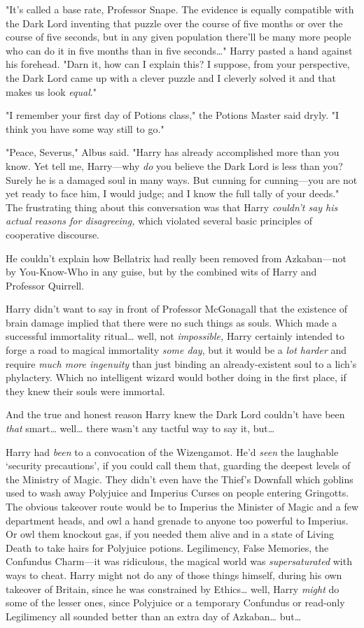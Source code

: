 "It's called a base rate, Professor Snape. The evidence is equally compatible
with the Dark Lord inventing that puzzle over the course of five months or over
the course of five seconds, but in any given population there'll be many more
people who can do it in five months than in five seconds{\ldots}" Harry pasted
a hand against his forehead. "Darn it, how can I explain this? I suppose, from
your perspective, the Dark Lord came up with a clever puzzle and I cleverly
solved it and that makes us look \emph{equal}."

"I remember your first day of Potions class," the Potions Master said dryly. "I
think you have some way still to go."

"Peace, Severus," Albus said. "Harry has already accomplished more than you
know. Yet tell me, Harry---why \emph{do} you believe the Dark Lord is less than
you? Surely he is a damaged soul in many ways. But cunning for cunning---you
are not yet ready to face him, I would judge; and I know the full tally of your
deeds."
\later
The frustrating thing about this conversation was that Harry \emph{couldn't say
his actual reasons for disagreeing,} which violated several basic principles of
cooperative discourse.

He couldn't explain how Bellatrix had really been removed from Azkaban---not by
You-Know-Who in any guise, but by the combined wits of Harry and Professor
Quirrell.

Harry didn't want to say in front of Professor McGonagall that the existence of
brain damage implied that there were no such things as souls. Which made a
successful immortality ritual{\ldots} well, not \emph{impossible,} Harry
certainly intended to forge a road to magical immortality \emph{some day}, but
it would be a \emph{lot harder} and require \emph{much more ingenuity} than
just binding an already-existent soul to a lich's phylactery. Which no
intelligent wizard would bother doing in the first place, if they knew their
souls were immortal.

And the true and honest reason Harry knew the Dark Lord couldn't have been
\emph{that} smart{\ldots} well{\ldots} there wasn't any tactful way to say it,
but{\ldots}

Harry had \emph{been} to a convocation of the Wizengamot. He'd \emph{seen} the
laughable `security precautions', if you could call them that, guarding the
deepest levels of the Ministry of Magic. They didn't even have the Thief's
Downfall which goblins used to wash away Polyjuice and Imperius Curses on
people entering Gringotts. The obvious takeover route would be to Imperius the
Minister of Magic and a few department heads, and owl a hand grenade to anyone
too powerful to Imperius. Or owl them knockout gas, if you needed them alive
and in a state of Living Death to take hairs for Polyjuice potions.
Legilimency, False Memories, the Confundus Charm---it was ridiculous, the
magical world was \emph{supersaturated} with ways to cheat. Harry might not do
any of those things himself, during his own takeover of Britain, since he was
constrained by Ethics{\ldots} well, Harry \emph{might} do some of the lesser
ones, since Polyjuice or a temporary Confundus or read-only Legilimency all
sounded better than an extra day of Azkaban{\ldots} but{\ldots}

